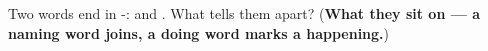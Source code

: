 \begin{tcolorbox}[breakable,colback=teal!4,colframe=teal!35!black,title={Before you move on}]
Two words end in -: \textbf{} and \textbf{}. What tells them apart? (\textbf{What they sit on — a naming word joins, a doing word marks a happening.})
\end{tcolorbox}
